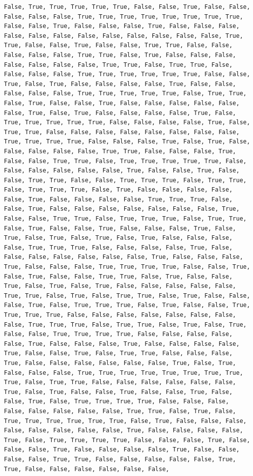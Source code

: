 \documentclass[
  letterpaper,
  DIV=11,
  numbers=noendperiod]{scrartcl}
\begin{document}
\begin{verbatim}
False, True, True, True, True, True, False, False, True, False, False, False, False, False, True, True, True, True, True, True, True, True, False, False, True, False, False, False, True, False, False, False, False, False, False, False, False, False, False, False, False, True, True, False, False, True, False, False, True, True, False, False, False, False, False, True, True, False, True, False, False, False, False, False, False, False, True, True, False, True, True, False, False, False, False, True, True, True, True, True, True, False, False, True, False, True, False, False, False, False, True, False, False, False, False, False, True, True, True, True, True, False, True, True, False, True, False, False, True, False, False, False, False, False, False, True, False, True, False, False, False, False, True, False, True, True, True, True, True, False, False, False, False, True, False, True, True, False, False, False, False, False, False, False, False, True, True, True, True, False, False, False, True, False, True, False, False, False, False, False, True, True, False, False, False, True, False, False, True, True, False, True, True, True, True, True, False, False, False, False, False, False, True, False, False, True, False, False, True, True, False, False, True, True, True, False, True, True, False, True, True, True, False, True, False, False, False, False, False, True, False, False, False, False, True, True, True, False, False, True, False, False, False, False, False, False, False, True, False, False, True, True, False, True, True, True, False, True, True, False, True, False, False, True, False, False, False, True, False, True, False, True, False, True, False, True, False, False, False, False, True, True, True, False, False, False, False, True, False, False, False, False, False, False, False, True, False, False, False, True, False, False, False, True, True, True, True, False, False, True, False, True, False, False, True, True, False, True, False, False, True, False, True, False, True, False, False, False, False, False, True, True, False, True, False, True, True, False, True, False, False, False, True, False, True, True, True, False, True, False, False, True, True, True, True, False, False, False, False, False, False, False, False, True, True, True, False, True, True, False, True, False, True, False, False, True, True, True, True, False, False, False, False, False, True, False, False, False, True, False, False, False, False, True, False, False, True, False, True, True, False, False, False, True, False, False, False, False, False, False, True, False, True, False, False, False, True, True, True, True, True, True, True, True, True, False, True, True, False, False, False, False, False, False, True, False, True, False, False, True, False, False, True, False, False, True, False, True, True, True, True, False, False, False, False, False, False, False, False, True, True, False, True, False, True, True, True, True, True, True, False, True, False, False, False, False, False, False, False, False, True, False, False, False, False, True, False, True, True, True, True, False, False, False, True, False, False, False, True, False, False, False, False, True, False, False, False, False, True, True, False, False, False, False, False, True, True, False, False, False, False, False, False, 
\end{verbatim}
\end{document}
